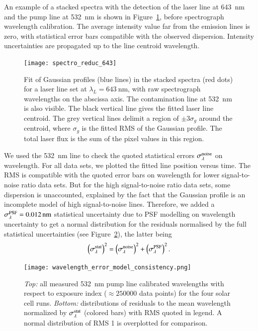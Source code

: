 An example of a stacked spectra with the detection of the laser line at \SI{643}{\nm} and the pump line at \SI{532}{\nm} is shown in Figure~\ref{fig:spectro_reduc_643}, before spectrograph wavelength calibration. The average intensity value far from the emission lines is zero, with statistical error bars compatible with the observed dispersion. Intensity uncertainties are propagated up to the line centroid wavelength. 

\begin{figure}[!h]
\centering
\texttt{[image: spectro\_reduc\_643]}
\caption{Fit of Gaussian profiles (blue lines) in the stacked spectra (red dots) for a laser line set at $\lambda_L=\SI{643}{\nm}$, with raw spectrograph wavelengths on the abscissa axis. The contamination line at \SI{532}{nm} is also visible. The black vertical line gives the fitted laser line centroid. The grey vertical lines delimit a region of $\pm 3\sigma_g$ around the centroid, where $\sigma_g$ is the fitted RMS of the Gaussian profile. The total laser flux is the sum of the pixel values in this region.}\label{fig:spectro_reduc_643}
\end{figure}

We used the \SI{532}{\nm} line to check the quoted statistical errors $\sigma_\lambda^{\rm noise}$ on wavelength. For all data sets, we plotted the fitted line position versus time. The RMS is compatible with the quoted error bars on wavelength for lower signal-to-noise ratio data sets. But for the high signal-to-noise ratio data sets, some dispersion is unaccounted, explained by the fact that the Gaussian profile is an incomplete model of high signal-to-noise lines. Therefore, we added a $\sigma_\lambda^{\rm PSF}=\SI{0.012}{\nm}$ statistical uncertainty due to PSF modelling on wavelength uncertainty to get a normal distribution for the residuals normalised by the full statistical uncertainties (see Figure~\ref{fig:wavelength_error_model_consistency}), the latter being
\begin{equation}
    \left(\sigma_{\lambda}^{\rm stat}\right)^2 =  \left(\sigma_{\lambda}^{\rm noise}\right)^2 +  \left(\sigma_{\lambda}^{\rm PSF}\right)^2.
\end{equation}

\begin{figure}[!h]
\centering
\texttt{[image: wavelength\_error\_model\_consistency.png]}
\caption{\textit{Top:} all measured \SI{532}{\nm} pump line calibrated wavelengths with respect to exposure index ($\approx\num{250000}$ data points) for the four solar cell runs. \textit{Bottom:} distributions of residuals to the mean wavelength normalized by $\sigma_{\lambda}^{\rm stat}$ (colored bars) with RMS quoted in legend. A normal distribution of RMS 1 is overplotted for comparison.}\label{fig:wavelength_error_model_consistency}
\end{figure}


